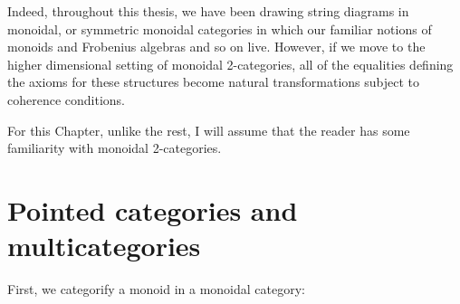 Indeed, throughout this thesis, we have been drawing string diagrams in monoidal, or symmetric monoidal categories in which our familiar notions of monoids and Frobenius algebras and so on live.  However, if we move to the higher dimensional setting of monoidal 2-categories, all of the equalities defining the axioms for these structures become natural transformations subject to  coherence conditions.   


For this Chapter, unlike the rest, I will assume that the reader has some familiarity with monoidal 2-categories.


\section{Pointed categories and multicategories}
 First, we categorify a monoid in a monoidal category:

